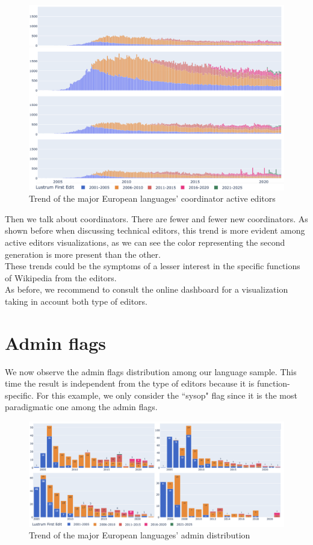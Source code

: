 \begin{figure}[h]
    \centering
    \includegraphics[width=470px]{img/coord_trend.png}
    \caption{Trend of the major European languages' coordinator active editors}
    \label{fig:coord_trend}
\end{figure}

Then we talk about coordinators. There are fewer and fewer new coordinators. As shown before when discussing technical editors, this trend is more evident among active editors visualizations, as we can see the color representing the second generation is more present than the other.\\
These trends could be the symptoms of a lesser interest in the specific functions of Wikipedia from the editors.\\
As before, we recommend to consult the online dashboard for a visualization taking in account both type of editors.

\section{Admin flags}
\label{sec:admin_conclusion}

We now observe the admin flags distribution among our language sample. This time the result is independent from the type of editors because it is function-specific. For this example, we only consider the ``sysop" flag since it is the most paradigmatic one among the admin flags.

\begin{figure}[h]
    \centering
    \includegraphics[width=470px]{img/admin_trend.png}
    \caption{Trend of the major European languages' admin distribution}
    \label{fig:admin_trend}
\end{figure}

